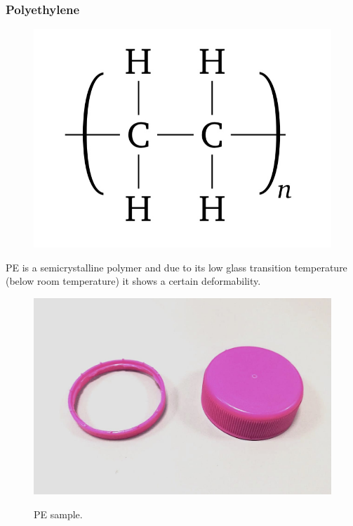 \documentclass[a4paper, 11pt]{article}
\begin{document}
\subsubsection{Polyethylene}

\begin{figure}[htp]
	\centering
	{\includegraphics[scale=0.12]{pe_chem}}
	\captionsetup{justification=centering}
	\label{fig:PE}
\end{figure}
PE is a semicrystalline polymer and due to its low glass transition temperature (below room temperature) it shows a certain deformability.
\begin{figure}[htp]
	\centering
	{\includegraphics[scale=0.15]{PE}}
	\captionsetup{justification=centering}
	\caption{PE sample.}
	\label{fig:PE}
\end{figure}
\end{document}
